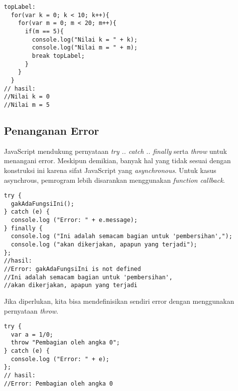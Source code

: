 \begin{lstlisting}
topLabel:
  for(var k = 0; k < 10; k++){
    for(var m = 0; m < 20; m++){
      if(m == 5){
        console.log("Nilai k = " + k);
        console.log("Nilai m = " + m);
        break topLabel;
      }
    }
  }
// hasil: 
//Nilai k = 0
//Nilai m = 5
\end{lstlisting}

\subsection{Penanganan Error}

JavaScript mendukung pernyataan \textit{try .. catch .. finally} serta \textit{throw} untuk menangani error. Meskipun demikian, banyak hal yang tidak sesuai dengan konstruksi ini karena sifat JavaScript yang \textit{asynchronous}. Untuk kasus asynchrous, pemrogram lebih disarankan menggunakan \textit{function callback}.

\begin{lstlisting}
try {
  gakAdaFungsiIni();
} catch (e) {
  console.log ("Error: " + e.message);
} finally {
  console.log ("Ini adalah semacam bagian untuk 'pembersihan',"); 
  console.log ("akan dikerjakan, apapun yang terjadi");
};
//hasil:
//Error: gakAdaFungsiIni is not defined
//Ini adalah semacam bagian untuk 'pembersihan', 
//akan dikerjakan, apapun yang terjadi
\end{lstlisting}

Jika diperlukan, kita bisa mendefinisikan sendiri error dengan menggunakan pernyataan \textit{throw}.

\begin{lstlisting}
try {
  var a = 1/0;
  throw "Pembagian oleh angka 0";
} catch (e) {
  console.log ("Error: " + e);
};
// hasil:
//Error: Pembagian oleh angka 0
\end{lstlisting}

